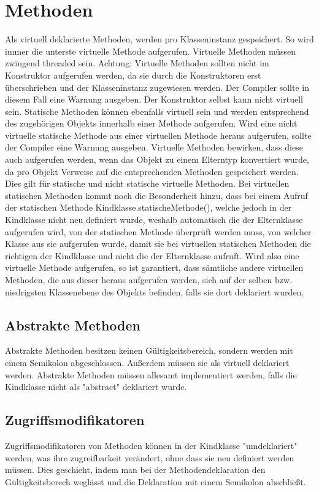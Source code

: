 \section{Methoden}
Als virtuell deklarierte Methoden, werden pro Klasseninstanz gespeichert. So wird immer die unterste virtuelle Methode aufgerufen.
Virtuelle Methoden müssen zwingend threaded sein.
Achtung: Virtuelle Methoden sollten nicht im Konstruktor aufgerufen werden, da sie durch die Konstruktoren erst überschrieben
und der Klasseninstanz zugewiesen werden. Der Compiler sollte in diesem Fall eine Warnung ausgeben.
Der Konstruktor selbst kann nicht virtuell sein.
Statische Methoden können ebenfalls virtuell sein und werden entsprechend des zugehörigen Objekts innerhalb einer Methode aufgerufen.
Wird eine nicht virtuelle statische Methode aus einer virtuellen Methode heraus aufgerufen, sollte der Compiler eine Warnung ausgeben.
Virtuelle Methoden bewirken, dass diese auch aufgerufen werden, wenn das Objekt zu einem Elterntyp konvertiert wurde, da pro
Objekt Verweise auf die entsprechenden Methoden gespeichert werden. Dies gilt für statische und nicht statische virtuelle Methoden.
Bei virtuellen statischen Methoden kommt noch die Besonderheit hinzu, dass bei einem Aufruf der statischen Methode Kindklasse.statischeMethode(),
welche jedoch in der Kindklasse nicht neu definiert wurde, weshalb automatisch die der Elternklasse aufgerufen wird, von der statischen Methode
überprüft werden muss, von welcher Klasse aus sie aufgerufen wurde, damit sie bei virtuellen statischen Methoden die richtigen der Kindklasse und
nicht die der Elternklasse aufruft.
Wird also eine virtuelle Methode aufgerufen, so ist garantiert, dass sämtliche andere virtuellen Methoden, die aus dieser heraus aufgerufen werden,
sich auf der selben bzw. niedrigsten Klassenebene des Objekts befinden, falls sie dort deklariert wurden.

\subsection{Abstrakte Methoden}
Abstrakte Methoden besitzen keinen Gültigkeitsbereich, sondern werden mit einem Semikolon abgeschlossen.
Außerdem müssen sie als virtuell deklariert werden.
Abstrakte Methoden müssen allesamt implementiert werden, falls die Kindklasse nicht als "abstract" deklariert wurde.

\subsection{Zugriffsmodifikatoren}
Zugriffsmodifikatoren von Methoden können in der Kindklasse "umdeklariert" werden, was ihre zugreifbarkeit verändert,
ohne dass sie neu definiert werden müssen.
Dies geschieht, indem man bei der Methodendeklaration den Gültigkeitsberech weglässt und die Deklaration mit einem Semikolon abschließt.

